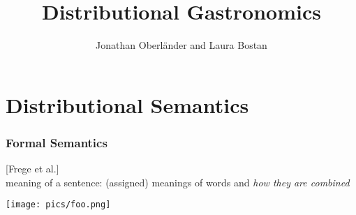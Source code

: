\documentclass{beamer}
\title{Distributional Gastronomics}
\author[Oberl\"ander and Bostan]{Jonathan Oberl\"ander and Laura Bostan}
\institute[Trento University]{Trento Universtity\\\vspace{1cm}\texttt{[image: pics/esslli.png]}}
\date{}%
\begin{document}
\maketitle %

\section{Distributional Semantics}

\begin{frame}
    \frametitle{Formal Semantics}
    {\footnotesize [Frege et al.]}\\

    meaning of a sentence: (assigned) meanings of words and \textit{how they are combined}

    \vspace{0.3cm}

    \centering\texttt{[image: pics/foo.png]}
\end{frame}
\end{document}
